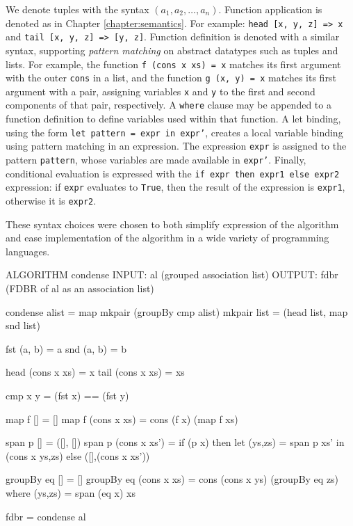 \documentclass[../main.tex]{subfiles}
\begin{document}
We denote tuples with the syntax $(a_1, a_2, \dots, a_n)$.
Function application is denoted as in Chapter \ref{chapter:semantics}.
For example: \texttt{head [x, y, z] => x} and \texttt{tail [x, y, z] => [y, z]}.
Function definition is denoted with a similar syntax, supporting {\em pattern matching} on abstract datatypes such
as tuples and lists.  For example, the function \texttt{f (cons x xs) = x} matches its first argument with the outer \texttt{cons} in a list, and the function \texttt{g (x, y) = x} matches its first argument with a pair, assigning variables \texttt{x} and \texttt{y} to the first and second components of that pair, respectively.  A \texttt{where} clause may be appended to a function definition to define variables used within that function.  A let binding, using the form \texttt{let pattern = expr in expr'}, creates a local variable binding using pattern matching in an expression.  The expression \texttt{expr} is assigned to the pattern \texttt{pattern}, whose variables are made available in \texttt{expr'}.
Finally, conditional evaluation is expressed with the \texttt{if expr then expr1 else expr2} expression: if \texttt{expr} evaluates to \texttt{True}, then the result of the expression is \texttt{expr1}, otherwise it is \texttt{expr2}.

These syntax choices were chosen to both simplify expression of the algorithm and ease implementation of the algorithm in a wide variety of programming languages.

\begin{code}

ALGORITHM condense
INPUT: al (grouped association list)
OUTPUT: fdbr (FDBR of al as an association list)

condense alist = map mkpair (groupBy cmp alist)
mkpair list = (head list, map snd list)

fst (a, b) = a
snd (a, b) = b

head (cons x xs) = x
tail (cons x xs) = xs

cmp x y = (fst x) == (fst y)

map f [] = []
map f (cons x xs) = cons (f x) (map f xs)

span p [] =  ([], [])
span p (cons x xs')
 = if (p x)
   then let (ys,zs) = span p xs' in (cons x ys,zs)
   else ([],(cons x xs'))

groupBy eq []          = []
groupBy eq (cons x xs) = cons (cons x ys) (groupBy eq zs)
where (ys,zs) = span (eq x) xs

fdbr = condense al

\end{code}
\end{document}
